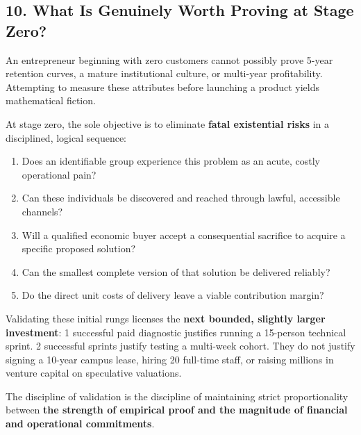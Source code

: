\subsection*{10. What Is Genuinely Worth Proving at Stage Zero?}

An entrepreneur beginning with zero customers cannot possibly prove 5-year retention curves, a mature institutional culture, or multi-year profitability. Attempting to measure these attributes before launching a product yields mathematical fiction.

At stage zero, the sole objective is to eliminate \textbf{fatal existential risks} in a disciplined, logical sequence:
\begin{enumerate}
    \item Does an identifiable group experience this problem as an acute, costly operational pain?
    \item Can these individuals be discovered and reached through lawful, accessible channels?
    \item Will a qualified economic buyer accept a consequential sacrifice to acquire a specific proposed solution?
    \item Can the smallest complete version of that solution be delivered reliably?
    \item Do the direct unit costs of delivery leave a viable contribution margin?
\end{enumerate}

Validating these initial rungs licenses the \textbf{next bounded, slightly larger investment}: 1 successful paid diagnostic justifies running a 15-person technical sprint. 2 successful sprints justify testing a multi-week cohort. They do not justify signing a 10-year campus lease, hiring 20 full-time staff, or raising millions in venture capital on speculative valuations.

The discipline of validation is the discipline of maintaining strict proportionality between \textbf{the strength of empirical proof and the magnitude of financial and operational commitments}.

